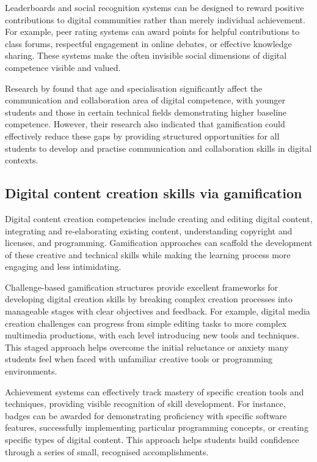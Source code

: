 \documentclass[cte]{acnsart}
\begin{document}
Leaderboards and social recognition systems can be designed to reward positive contributions to digital communities rather than merely individual achievement. For example, peer rating systems can award points for helpful contributions to class forums, respectful engagement in online debates, or effective knowledge sharing. These systems make the often invisible social dimensions of digital competence visible and valued.

Research by \citet{Barboutidis2023613} found that age and specialisation significantly affect the communication and collaboration area of digital competence, with younger students and those in certain technical fields demonstrating higher baseline competence. However, their research also indicated that gamification could effectively reduce these gaps by providing structured opportunities for all students to develop and practise communication and collaboration skills in digital contexts.

\subsection{Digital content creation skills via gamification}

Digital content creation competencies include creating and editing digital content, integrating and re-elaborating existing content, understanding copyright and licenses, and programming. Gamification approaches can scaffold the development of these creative and technical skills while making the learning process more engaging and less intimidating.

Challenge-based gamification structures provide excellent frameworks for developing digital creation skills by breaking complex creation processes into manageable stages with clear objectives and feedback. For example, digital media creation challenges can progress from simple editing tasks to more complex multimedia productions, with each level introducing new tools and techniques. This staged approach helps overcome the initial reluctance or anxiety many students feel when faced with unfamiliar creative tools or programming environments.

Achievement systems can effectively track mastery of specific creation tools and techniques, providing visible recognition of skill development. For instance, badges can be awarded for demonstrating proficiency with specific software features, successfully implementing particular programming concepts, or creating specific types of digital content. This approach helps students build confidence through a series of small, recognised accomplishments.
\end{document}
